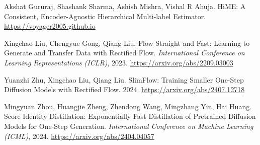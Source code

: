 \documentclass[12pt]{article}
\begin{document}
{\begin{enumerate}[leftmargin=1.3em, itemsep=1pt, label={[\arabic*]}]
\item \label{ref10} Akshat Gururaj, Shashank Sharma, Ashish Mishra, Vishal R Ahuja. HiME: A Consistent, Encoder-Agnostic Hierarchical Multi-label Estimator. \url{https://voyager2005.github.io}
\item \label{ref11} Xingchao Liu, Chengyue Gong, Qiang Liu. Flow Straight and Fast: Learning to Generate and Transfer Data with Rectified Flow. \emph{International Conference on Learning Representations (ICLR)}, 2023. \url{https://arxiv.org/abs/2209.03003}
\item \label{ref12} Yuanzhi Zhu, Xingchao Liu, Qiang Liu. SlimFlow: Training Smaller One-Step Diffusion Models with Rectified Flow. 2024. \url{https://arxiv.org/abs/2407.12718}
\item \label{ref13} Mingyuan Zhou, Huangjie Zheng, Zhendong Wang, Mingzhang Yin, Hai Huang. Score Identity Distillation: Exponentially Fast Distillation of Pretrained Diffusion Models for One-Step Generation. \emph{International Conference on Machine Learning (ICML)}, 2024. \url{https://arxiv.org/abs/2404.04057}
\end{enumerate}
}
\end{document}

